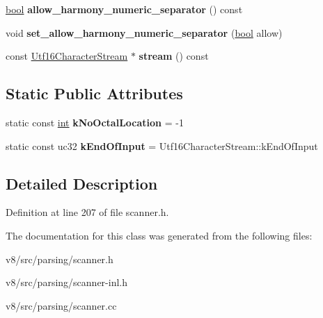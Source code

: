 \begin{DoxyCompactItemize}
\mbox{\hyperlink{classbool}{bool}} {\bfseries allow\+\_\+harmony\+\_\+numeric\+\_\+separator} () const
\item 
\mbox{\label{classv8_1_1internal_1_1Scanner_a7d19f92f93c593d71ac27c423b006883}} 
void {\bfseries set\+\_\+allow\+\_\+harmony\+\_\+numeric\+\_\+separator} (\mbox{\hyperlink{classbool}{bool}} allow)
\item 
\mbox{\label{classv8_1_1internal_1_1Scanner_a0932fdd38ace79116186cae247624d6e}} 
const \mbox{\hyperlink{classv8_1_1internal_1_1Utf16CharacterStream}{Utf16\+Character\+Stream}} $\ast$ {\bfseries stream} () const
\end{DoxyCompactItemize}
\subsection*{Static Public Attributes}
\begin{DoxyCompactItemize}
\item 
\mbox{\label{classv8_1_1internal_1_1Scanner_a3ee71c47804e353b42e2c114ee1471ed}} 
static const \mbox{\hyperlink{classint}{int}} {\bfseries k\+No\+Octal\+Location} = -\/1
\item 
\mbox{\label{classv8_1_1internal_1_1Scanner_aab809f1e38e8ff4450b3318b86e73a8d}} 
static const uc32 {\bfseries k\+End\+Of\+Input} = Utf16\+Character\+Stream\+::k\+End\+Of\+Input
\end{DoxyCompactItemize}


\subsection{Detailed Description}


Definition at line 207 of file scanner.\+h.



The documentation for this class was generated from the following files\+:\begin{DoxyCompactItemize}
\item 
v8/src/parsing/scanner.\+h\item 
v8/src/parsing/scanner-\/inl.\+h\item 
v8/src/parsing/scanner.\+cc\end{DoxyCompactItemize}

